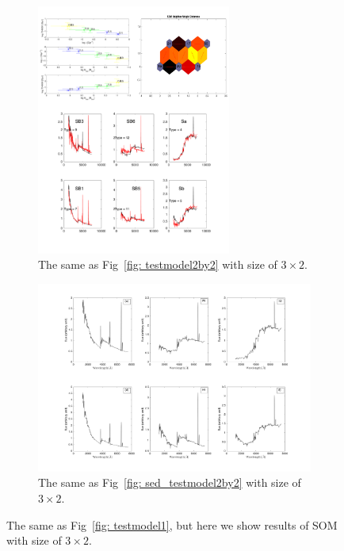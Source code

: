     \begin{figure}
        \centering
        \begin{subfigure}[b]{0.5\textwidth}
            \centering
            \includegraphics[width=0.7\textwidth]{../images/test_model/3by2_nei3.pdf}
            \caption{The same as Fig~\ref{fig: testmodel2by2} with size of $3\times2$.}
             \label{fig: testmodel3by2}
        \end{subfigure}
        \hfill
        \begin{subfigure}[b]{0.5\textwidth} 
            \centering
            \includegraphics[width=\textwidth]{../images/test_model/SED_total2by3nei3.png}
            \caption{The same as Fig~\ref{fig: sed_testmodel2by2} with size of $3\times2$.}
             \label{fig: sed_testmodel3by2}
        \end{subfigure}
        \caption{The same as Fig~\ref{fig: testmodel1}, but here we show results of SOM with size of $3\times2$.  }
        \label{fig: testmodel2}
            
    \end{figure}
